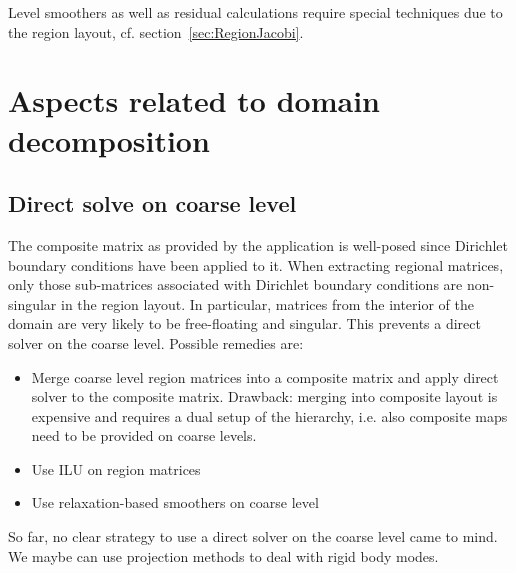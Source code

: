 \documentclass[11pt]{article}
\begin{document}
Level smoothers as well as residual calculations require special techniques due to the region layout, cf. section~\ref{sec:RegionJacobi}.

\section{Aspects related to domain decomposition}

\subsection{Direct solve on coarse level}

The composite matrix as provided by the application is well-posed since Dirichlet boundary conditions have been applied to it. 
When extracting regional matrices, only those sub-matrices associated with Dirichlet boundary conditions are non-singular
in the region layout. In particular, matrices from the interior of the domain are very likely to be free-floating and singular. 
This prevents a direct solver on the coarse level. Possible remedies are:
\begin{itemize}
\item Merge coarse level region matrices into a composite matrix and apply direct solver to the composite matrix. 
Drawback: merging into composite layout is expensive and requires a dual setup of the hierarchy, 
i.e. also composite maps need to be provided on coarse levels.
\item Use ILU on region matrices
\item Use relaxation-based smoothers on coarse level
\end{itemize}
So far, no clear strategy to use a direct solver on the coarse level came to mind. 
We maybe can use projection methods to deal with rigid body modes.
\end{document}
